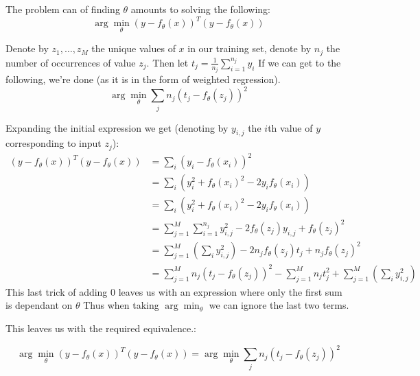 The problem can of finding $\theta$ amounts to solving the following:
$$\arg\min_\theta \left(y - f_\theta(x)\right)^T \left(y - f_\theta(x)\right)$$

Denote by $z_1, \dots, z_M$ the unique values of $x$ in our training set, denote by $n_j$ the number of occurrences of value $z_j$. 
Then let $t_j = \frac{1}{n_j}\sum_{i=1}^{n_j} y_i$
If we can get to the following, we're done (as it is in the form of weighted regression). 
$$\arg\min_\theta \sum_j n_j \left(t_j - f_\theta(z_j)\right)^2$$

Expanding the initial expression we get (denoting by $y_{i,j}$ the $i$th value of $y$ corresponding to input $z_j$):
\begin{align*}
     \left(y - f_\theta(x)\right)^T \left(y - f_\theta(x)\right) &= \sum_i \left(y_i - f_\theta(x_i)\right)^2 \\
    &= \sum_i \left(y_i^2 + f_\theta(x_i)^2 - 2 y_i f_\theta(x_i)\right) \\
    &= \sum_i \left(y_i^2 + f_\theta(x_i)^2 - 2 y_i f_\theta(x_i)\right) \\
    &= \sum_{j=1}^M \sum_{i=1}^{n_j}  y_{i,j}^2 - 2 f_\theta(z_j) y_{i,j} + f_\theta(z_j)^2\\
    &= \sum_{j=1}^M   \left(\sum_i y_{i,j}^2\right) - 2 n_j f_\theta(z_j) t_j + n_j f_\theta(z_j)^2\\
    &= \sum_{j=1}^M   n_j  (t_j -  f_\theta(z_j)) ^ 2 - \sum_{j=1}^M n_j t_j^2 + \sum_{j=1}^M   \left(\sum_i y_{i,j}^2\right) 
\end{align*}
This last trick of adding $0$ leaves us with an expression where only the first sum is dependant on $\theta$
Thus when taking $\arg\min_\theta$ we can ignore the last two terms.

This leaves us with the required equivalence.:

$$\arg\min_\theta \left(y - f_\theta(x)\right)^T \left(y - f_\theta(x)\right) = \arg\min_\theta \sum_j n_j \left(t_j - f_\theta(z_j)\right)^2$$

